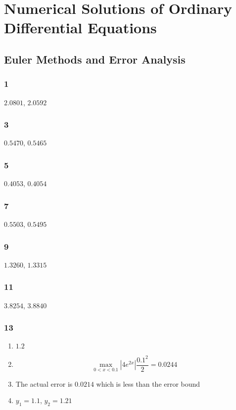 \documentclass{article}
\begin{document}
\section{Numerical Solutions of Ordinary Differential Equations}

\subsection{Euler Methods and Error Analysis}

\subsubsection{1}

$2.0801$, $2.0592$

\subsubsection{3}

$0.5470$, $0.5465$

\subsubsection{5}

$0.4053$, $0.4054$

\subsubsection{7}

$0.5503$, $0.5495$

\subsubsection{9}

$1.3260$, $1.3315$

\subsubsection{11}

$3.8254$, $3.8840$

\subsubsection{13}

\begin{enumerate}
  \item $1.2$

  \item \[\max_{0 < x < 0.1} |4 e^{2 x}| \frac{0.1^2}{2} = 0.0244\]

  \item The actual error is $0.0214$ which is less than the error bound

  \item $y_1 = 1.1$, $y_2 = 1.21$
\end{enumerate}
\end{document}
